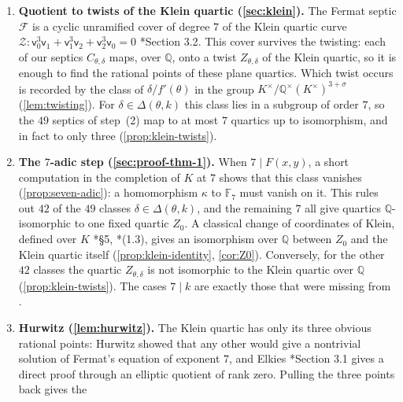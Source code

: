 \documentclass[12pt]{amsart}
\newcommand{\F}{{\mathbb F}}
\newcommand{\Q}{\mathbb{Q}}
\newcommand{\Qbar}{{\overline{\Q}}}
\newcommand{\calF}{{\mathcal F}}
\newcommand{\calZ}{{\mathcal Z}}
\newcommand{\sfu}{\mathsf{u}}
\newcommand{\sfv}{\mathsf{v}}
\numberwithin{equation}{section}
\theoremstyle{definition}
\begin{document}
\begin{enumerate}[leftmargin=*, itemsep=0.4em]
  So the rational points of the curves $C_{\theta,\delta}$ account for all the
  solutions. Over $K$ each of these curves becomes a diagonal
  septic, a twist of the Fermat curve $\calF\colon \sfu_0^7 + \sfu_1^7 + \sfu_2^7
  = 0$ to which it is isomorphic over $\Qbar$. Remarkably, all six pairs $(F,k)$
  that arise in \cref{sec:equations} lead to the same $49$ twists of the Fermat
  septic.
\item \textbf{Quotient to twists of the Klein quartic (\cref{sec:klein}).} The
  Fermat septic $\calF$ is a cyclic unramified cover of degree $7$ of the
  Klein quartic curve
  $\calZ \colon \sfv_0^3\sfv_1 + \sfv_1^3\sfv_2 + \sfv_2^3\sfv_0= 0$
  \cite{Elkies-99}*{Section 3.2}. This cover survives the twisting: each of our
  septics $C_{\theta,\delta}$ maps, over $\Q$, onto a twist $Z_{\theta,\delta}$ of the Klein
  quartic, so it is enough to find the rational points of these plane quartics.
  Which twist occurs is recorded by the class of $\delta/f'(\theta)$ in the
  group $K^{\times}/\Q^{\times}(K^{\times})^{3+\sigma}$
  (\cref{lem:twisting}). For $\delta \in \Delta(\theta,k)$ this class lies in a
  subgroup of order $7$, so the $49$ septics of step~(2) map to at most $7$
  quartics up to isomorphism, and in fact to only three
  (\cref{prop:klein-twists}).
\item \textbf{The $7$-adic step (\cref{sec:proof-thm-1}).} When
  $7 \mid F(x,y)$, a short computation in the completion of $K$ at $7$ shows that
  this class vanishes (\cref{prop:seven-adic}): a homomorphism $\kappa$ to
  $\F_7$ must vanish on it. This rules out $42$ of the $49$ classes
  $\delta \in \Delta(\theta,k)$, and the remaining $7$ all give quartics $\Q$-isomorphic
  to one fixed quartic $Z_0$. A classical change of coordinates of Klein,
  defined over $K$ \cite{Klein-1879}*{\S 5}, \cite{Elkies-99}*{(1.3)},
  gives an isomorphism over $\Q$ between $Z_0$ and the Klein quartic itself
  (\cref{prop:klein-identity}, \cref{cor:Z0}). Conversely, for the other $42$
  classes the quartic $Z_{\theta,\delta}$ is not isomorphic to the Klein quartic
  over $\Q$ (\cref{prop:klein-twists}).
  The cases $7 \mid k$ are exactly those that were missing from \cite{Furio--Lombardo26}.
\item \textbf{Hurwitz (\cref{lem:hurwitz}).} The Klein quartic has only its
  three obvious rational points: Hurwitz \cite{Hurwitz-08} showed that any other
  would give a nontrivial solution of Fermat's equation of exponent $7$, and
  Elkies \cite{Elkies-99}*{Section 3.1} gives a direct proof through an
  elliptic quotient of rank zero. Pulling the three points back gives the

\end{enumerate}
\end{document}
